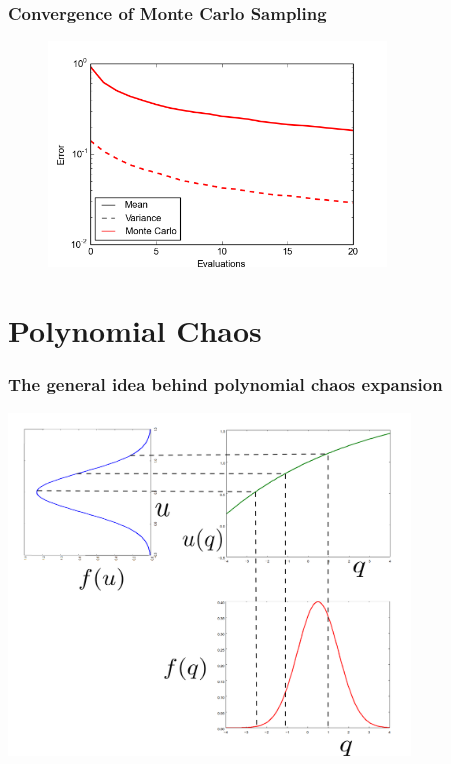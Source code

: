 \documentclass[handout]{beamer}
\begin{document}
\begin{frame}
  \frametitle{Convergence of Monte Carlo Sampling}

  \begin{figure}
    \includegraphics[width=0.8\textwidth]{MC_convergence_1D_1.png}
  \end{figure}
  
\end{frame}



\section{Polynomial Chaos}


\begin{frame}
  \frametitle{The general idea behind polynomial chaos expansion}
   \includegraphics[width=0.8\textwidth]{mapping.png}
\end{frame}
\end{document}
